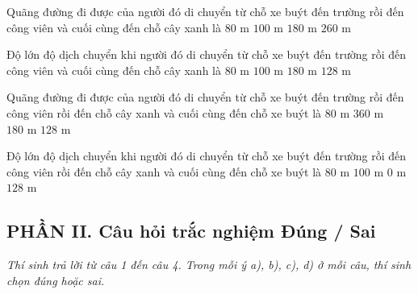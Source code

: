 \begin{ex} Quãng đường đi được của người đó di chuyển từ chỗ xe buýt đến trường rồi đến công viên và cuối cùng đến chỗ cây xanh là
\choice
{$80\text{ m}$}
{$100\text{ m}$}
{$180\text{ m}$}
{\True $260\text{ m}$}
\end{ex}

\begin{ex} Độ lớn độ dịch chuyển khi người đó di chuyển từ chỗ xe buýt đến trường rồi đến công viên và cuối cùng đến chỗ cây xanh là
\choice
{$80\text{ m}$}
{\True $100\text{ m}$}
{$180\text{ m}$}
{$128\text{ m}$}
\end{ex}

\begin{ex} Quãng đường đi được của người đó di chuyển từ chỗ xe buýt đến trường rồi đến công viên rồi đến chỗ cây xanh và cuối cùng đến chỗ xe buýt là
\choice
{$80\text{ m}$}
{\True $360\text{ m}$}
{$180\text{ m}$}
{$128\text{ m}$}
\end{ex}

\begin{ex} Độ lớn độ dịch chuyển khi người đó di chuyển từ chỗ xe buýt đến trường rồi đến công viên rồi đến chỗ cây xanh và cuối cùng đến chỗ xe buýt là
\choice
{$80\text{ m}$}
{$100\text{ m}$}
{\True $0\text{ m}$}
{$128\text{ m}$}
\end{ex}

\setcounter{ex}{0}
\subsection*{PHẦN II. Câu hỏi trắc nghiệm Đúng / Sai}
\textit{Thí sinh trả lời từ câu 1 đến câu 4. Trong mỗi ý a), b), c), d) ở mỗi câu, thí sinh chọn đúng hoặc sai.}

